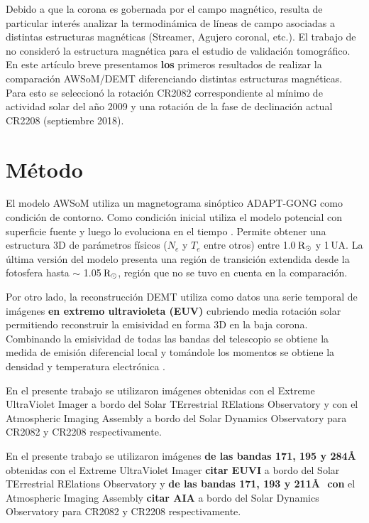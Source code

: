 \documentclass[baaa]{baaa}
\begin{document}
Debido a que la corona es gobernada por el campo magnético, resulta de particular interés analizar la termodinámica de líneas de campo asociadas a distintas estructuras magnéticas (Streamer, Agujero coronal, etc.). El trabajo de \citet{sachdeva_2019} no consideró la estructura magnética para el estudio de validación tomográfico. En este artículo breve presentamos \textbf{los} primeros resultados de realizar la comparación AWSoM/DEMT diferenciando distintas estructuras magnéticas. Para esto se seleccionó la rotación CR2082 correspondiente al mínimo de actividad solar del año 2009 y una rotación de la fase de  declinación actual CR2208 (septiembre 2018).


\section{Método}
El modelo AWSoM utiliza un magnetograma sinóptico ADAPT-GONG \citep{arge_2010} como condición de contorno. Como condición inicial utiliza el modelo potencial con superficie fuente y luego lo evoluciona en el tiempo \citep{vander_2010}. Permite obtener una estructura 3D de parámetros físicos ($N_e$ y $T_e$ entre otros) entre 1.0$\,{\rm R_\odot}$ y 1$\,$UA. La última versión del modelo presenta una región de transición extendida desde la fotosfera hasta $\sim$ 1.05$\,{\rm R_\odot}$, región que no se tuvo en cuenta en la comparación.


Por otro lado, la reconstrucción DEMT utiliza como datos una serie temporal de imágenes \textbf{en extremo ultravioleta (EUV)} cubriendo media rotación solar permitiendo reconstruir la emisividad en forma 3D en la baja corona. Combinando la emisividad de todas las bandas del telescopio se obtiene la \rm{medida de emisión diferencial local} y tomándole los momentos se obtiene la densidad y temperatura electrónica \citep{frazin_2009}.  


En el presente trabajo se utilizaron imágenes obtenidas con el Extreme UltraViolet Imager a bordo del Solar TErrestrial RElations Observatory y con el Atmospheric Imaging Assembly a bordo del Solar Dynamics Observatory para CR2082 y CR2208 respectivamente. 

En el presente trabajo se utilizaron imágenes \textbf{de las bandas 171, 195 y 284\AA} obtenidas con el Extreme UltraViolet Imager \textbf{citar EUVI} a bordo del Solar TErrestrial RElations Observatory y \textbf{de las bandas 171, 193 y 211\AA \,\ con} el Atmospheric Imaging Assembly \textbf{citar AIA} a bordo del Solar Dynamics Observatory para CR2082 y CR2208 respectivamente.
\end{document}
